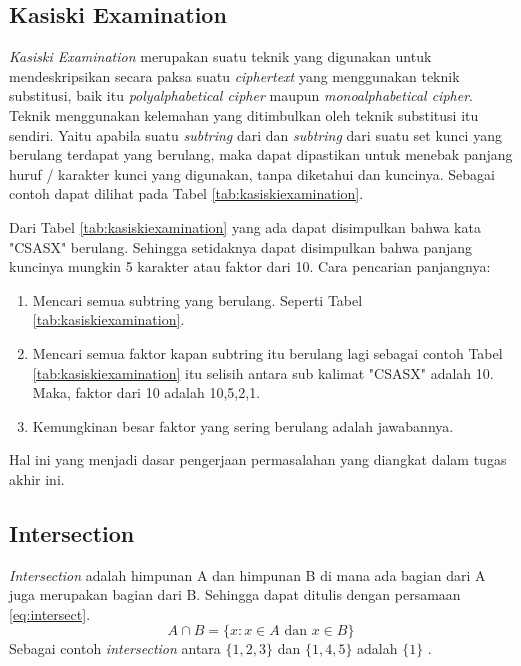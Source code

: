 	 \subsection{Kasiski Examination}
	 \textit{Kasiski Examination} merupakan suatu teknik yang digunakan untuk mendeskripsikan secara paksa suatu \textit{ciphertext} yang menggunakan teknik substitusi, baik itu \textit{polyalphabetical cipher} maupun \textit{monoalphabetical cipher}. Teknik menggunakan kelemahan yang ditimbulkan oleh teknik substitusi itu sendiri. Yaitu apabila suatu \textit{subtring} dari \plaintext dan \textit{subtring} dari suatu set kunci yang berulang terdapat yang berulang, maka dapat dipastikan untuk menebak panjang huruf / karakter kunci yang digunakan, tanpa diketahui \plaintext dan kuncinya. Sebagai contoh dapat dilihat pada Tabel \ref{tab:kasiskiexamination}.
	 \begin{table}[H]
	 	\caption{Contoh \textit{Kasiski Examintaion}}
		\label{tab:kasiskiexamination}
	\end{table}
	Dari Tabel \ref{tab:kasiskiexamination} yang ada dapat disimpulkan bahwa kata "CSASX" berulang. Sehingga setidaknya dapat disimpulkan bahwa panjang kuncinya mungkin 5 karakter atau faktor dari 10\cite{noauthor_kasiski_nodate}.
	Cara pencarian panjangnya:
	\begin{enumerate}
	\item Mencari semua subtring yang berulang. Seperti Tabel \ref{tab:kasiskiexamination}.
	\item Mencari semua faktor kapan subtring itu berulang lagi sebagai contoh Tabel \ref{tab:kasiskiexamination} itu selisih antara sub kalimat "CSASX" adalah 10. Maka, faktor dari 10 adalah 10,5,2,1. 
	\item Kemungkinan besar faktor yang sering berulang adalah jawabannya. 
	\end{enumerate}
	 Hal ini yang menjadi dasar pengerjaan permasalahan yang diangkat dalam tugas akhir ini.
 
	\subsection{Intersection}
	\textit{Intersection} adalah himpunan A dan himpunan B di mana ada bagian dari A juga merupakan bagian dari B. Sehingga dapat ditulis dengan persamaan \ref{eq:intersect}.
	\begin{equation}
	\label{eq:intersect}
	A\cap{B=\{x:x\in A \textrm{ dan } x \in B \}}
	\end{equation}
	Sebagai contoh \textit{intersection} antara $\{1,2,3\}$ dan $\{1,4,5\}$ adalah $\{1\}$\cite{devlin_joy_1993}	.
	
